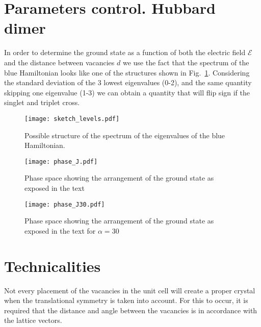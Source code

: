 \documentclass[a4paper]{article}
\begin{document}
\section{Parameters control. Hubbard dimer}

In order to determine the ground state as a function of both the electric field $\mathcal{E}$ and the distance between vacancies $d$ we use the fact that the spectrum of the blue Hamiltonian looks like one of the structures shown in Fig.~\ref{spectrum_dimer}. Considering the standard deviation of the 3 lowest eigenvalues (0-2), and the same quantity skipping one eigenvalue (1-3) we can obtain a quantity that will flip sign if the singlet and triplet cross.

\begin{figure}[h!]
\centering
  \texttt{[image: sketch\_levels.pdf]}
\vspace{-5pt}
\caption{Possible structure of the spectrum of the eigenvalues of the blue Hamiltonian.}
\label{spectrum_dimer}
\end{figure}
\FloatBarrier

\begin{figure}[h!]
\centering
  \texttt{[image: phase\_J.pdf]}
\vspace{-5pt}
\caption{Phase space showing the arrangement of the ground state as exposed in the text}
\label{}
\end{figure}
\FloatBarrier

\begin{figure}[h!]
\centering
  \texttt{[image: phase\_J30.pdf]}
\vspace{-5pt}
\caption{Phase space showing the arrangement of the ground state as exposed in the text for $\alpha=30$}
\label{}
\end{figure}
\FloatBarrier



\newpage
\appendix
\section{Technicalities}
Not every placement of the vacancies in the unit cell will create a proper crystal when the translational symmetry is taken into account. For this to occur, it is required that the distance and angle between the vacancies is in accordance with the lattice vectors.
\end{document}
